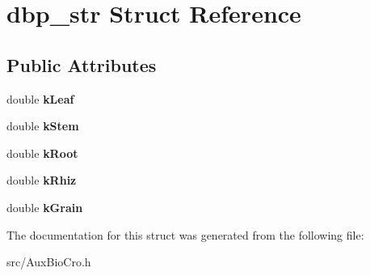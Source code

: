 \hypertarget{structdbp__str}{\section{dbp\-\_\-str Struct Reference}
\label{structdbp__str}
}
\subsection*{Public Attributes}
\begin{DoxyCompactItemize}
\item 
\hypertarget{structdbp__str_af161cea739e0d457e5cd7dd76e2c5df2}{double {\bfseries k\-Leaf}}\label{structdbp__str_af161cea739e0d457e5cd7dd76e2c5df2}

\item 
\hypertarget{structdbp__str_a7bae00351e17dc9937c5cc3cedba9d1e}{double {\bfseries k\-Stem}}\label{structdbp__str_a7bae00351e17dc9937c5cc3cedba9d1e}

\item 
\hypertarget{structdbp__str_a1330288684ed02913ac11c9d5aba18e2}{double {\bfseries k\-Root}}\label{structdbp__str_a1330288684ed02913ac11c9d5aba18e2}

\item 
\hypertarget{structdbp__str_a899d9df8e570b39583ea28477a320b8d}{double {\bfseries k\-Rhiz}}\label{structdbp__str_a899d9df8e570b39583ea28477a320b8d}

\item 
\hypertarget{structdbp__str_a167edef1760e88528197628ff0bff8d9}{double {\bfseries k\-Grain}}\label{structdbp__str_a167edef1760e88528197628ff0bff8d9}

\end{DoxyCompactItemize}


The documentation for this struct was generated from the following file\-:\begin{DoxyCompactItemize}
\item 
src/Aux\-Bio\-Cro.\-h\end{DoxyCompactItemize}
